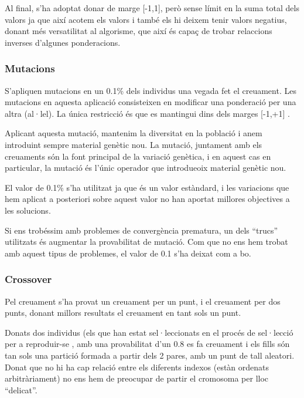 \documentclass[titlepage,a4paper,12pt]{book}
\begin{document}
Al final, s'ha adoptat donar de marge [-1,1], però sense límit en la suma total
dels valors ja que així acotem els valors i també els hi deixem tenir valors
negatius, donant més versatilitat al algorisme, que així és capaç de trobar
relaccions inverses d'algunes ponderacions.


\subsubsection{Mutacions} %
\label{ssub:Mutacions}

S'apliquen mutacions en un 0.1\% dels individus una vegada fet el creuament.
Les mutacions en aquesta aplicació consisteixen en modificar una ponderació per
una altra (al·lel).  La única restricció és que es mantingui dins dels marges
[-1,+1] .  

Aplicant aquesta mutació, mantenim la diversitat en la població i anem
introduint sempre material genètic nou.  La mutació, juntament amb els
creuaments són la font principal de la variació genètica, i en aquest cas en
particular, la mutació és l'únic operador que introdueoix material genètic nou.

El valor de 0.1\% s'ha utilitzat ja que és un valor estàndard, i les variacions
que hem aplicat a posteriori sobre aquest valor no han aportat millores
objectives a les solucions.

Si ens trobéssim amb problemes de convergència prematura, un dels ``trucs''
utilitzats és augmentar la provabilitat de mutació.  Com que no ens hem trobat
amb aquest tipus de problemes, el valor de 0.1 s'ha deixat com a bo.

\subsubsection{Crossover} %
\label{ssub:Crossover}

Pel creuament s'ha provat un creuament per un punt, i el creuament per dos
punts, donant millors resultats el creuament en tant sols un punt.  

Donats dos individus (els que han estat sel·leccionats en el procés de
sel·lecció per a reproduir-se , amb una provabilitat d'un 0.8 es fa creuament i
els fills són tan sols una partició formada a partir dels 2 pares, amb un punt
de tall aleatori.  Donat que no hi ha cap relació entre els diferents indexos
(estàn ordenats arbitràriament) no ens hem de preocupar de partir el cromosoma
per lloc ``delicat''. 
\end{document}
